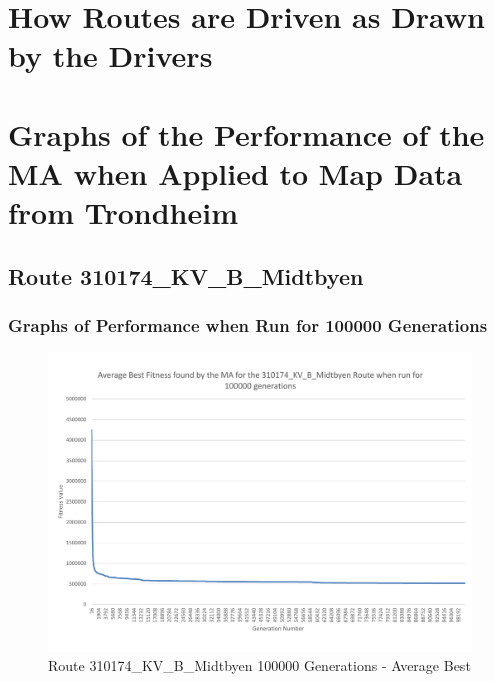 


\chapter{How Routes are Driven as Drawn by the Drivers} %
\label{cha:how_routes_are_driven_as_drawn_by_the_drivers}







\chapter{Graphs of the Performance of the MA when Applied to Map Data from Trondheim} %
\label{cha:gotpotmwatmdft}

\section{Route 310174\_KV\_B\_Midtbyen} %
\label{sec:route_310174_KV_B_Midtbyen}

\subsection{Graphs of Performance when Run for 100000 Generations} %
\label{sub:graphs_of_performance_when_run_for_100000_generations_KV_B}

\begin{landscape}
\begin{figure}[thbp]
	\centerline{\includegraphics[height=0.945\textwidth]{figures/Trondheim_graphs/KV_B/KV_B-100k_average_best.pdf}}
	\caption{Route 310174\_KV\_B\_Midtbyen 100000 Generations - Average Best}
	\label{fig:KV_B_100k_ab}
\end{figure}
\end{landscape}

